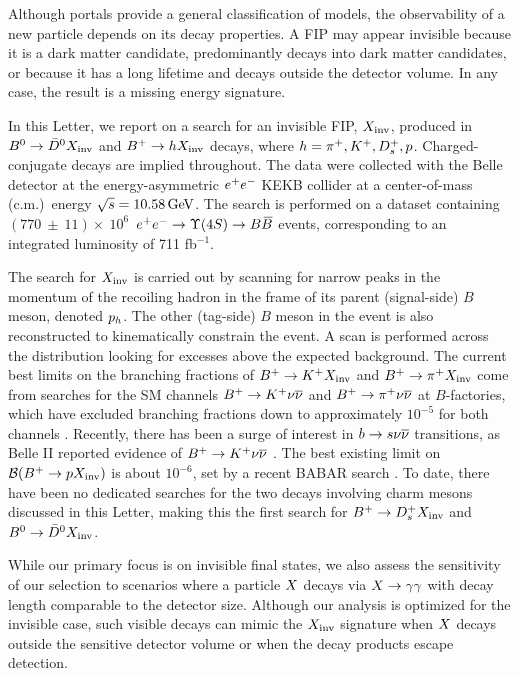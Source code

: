 Although portals provide a general classification of models, the observability of a new particle depends on its decay properties. A FIP may appear invisible because it is a dark matter candidate, predominantly decays into dark matter candidates, or because it has a long lifetime and decays outside the detector volume. In any case, the result is a missing energy signature.


In this Letter, we report on a search for an invisible FIP, $X_{\rm{inv}}$, produced in $B^0 \rightarrow \kern 0.2em\bar{\kern -0.2em D}{}^0X_{\rm{inv}}$ and $B^+\rightarrow hX_{\rm{inv}}$ decays, where $h = \pi^+, K^+, D^+_s, p$. Charged-conjugate decays are implied throughout. The data were collected with the Belle detector \cite{Belle:2000cnh} at the energy-asymmetric $e^+e^-$ KEKB collider \cite{Kurokawa:2001nw} at a center-of-mass (c.m.)\ energy $\sqrt{s} = 10.58 \mathrm{\,Ge\kern -0.1em V}$. The search is performed on a dataset containing $(770~\pm~11)\times~10^6$\ $\ep\en\to\Y4S\to B\Bb$ events, corresponding to an integrated luminosity of 711 fb$^{-1}$.


The search for $X_{\rm{inv}}$ is carried out by scanning for narrow peaks in the momentum of the recoiling hadron in the frame of its parent (signal-side) $B$ meson, denoted $p_{h}$. The other (tag-side) $B$ meson in the event is also reconstructed to kinematically constrain the event. A scan is performed across the \ph distribution looking for excesses above the expected background. The current best limits on the branching fractions of $B^+\rightarrow K^+X_{\rm{inv}}$ and $B^+\rightarrow\pi^+X_{\rm{inv}}$ come from searches for the SM channels $B^+ \rightarrow K^+\nu\overline{\nu}$ and $B^+ \rightarrow \pi^+\nu\overline{\nu}$ at $B$-factories, which have excluded branching fractions down to approximately $10^{-5}$ for both channels \cite{Lees_2013, PhysRevD.87.111103, Chen_2007, PhysRevD.96.091101}. Recently, there has been a surge of interest in $b\rightarrow s\nu\overline{\nu}$ transitions, as Belle II reported evidence of $B^+\rightarrow K^+\nu\overline{\nu}$ \cite{belleiiBtoKnunu}. The best existing limit on $\mathcal{B}(B^+ \rightarrow pX_{\rm{inv}})$ is about $10^{-6}$, set by a recent BABAR search \cite{BABAR_proton}. To date, there have been no dedicated searches for the two decays involving charm mesons discussed in this Letter, making this the first search for $B^+ \rightarrow D^+_s X_{\rm{inv}}$ and $B^0 \rightarrow \kern 0.2em\bar{\kern -0.2em D}{}^0 X_{\rm{inv}}$.


While our primary focus is on invisible final states, we also assess the sensitivity of our selection to scenarios where a particle $X$ decays via $X\rightarrow\gamma\gamma$ with decay length comparable to the detector size. Although our analysis is optimized for the invisible case, such visible decays can mimic the $X_{\rm{inv}}$ signature when $X$ decays outside the sensitive detector volume or when the decay products escape detection.



